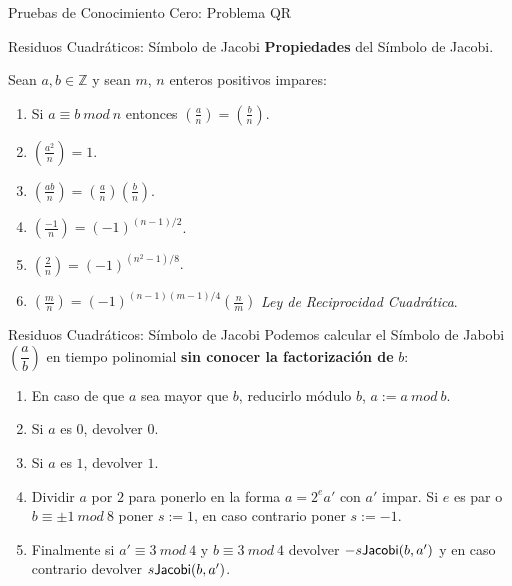 \documentclass{beamer}
\begin{document}
\begin{frame}{Pruebas de Conocimiento Cero: Problema QR}

\end{frame}




\maketitle


\appendix

\begin{frame}{Residuos Cuadráticos: Símbolo de Jacobi}
\textbf{Propiedades} del S\'imbolo de Jacobi.

Sean $a,b \in {\mathbb Z}$ y sean $m$, $n$ enteros positivos impares:
\begin{enumerate}
	\item Si $a\equiv b~mod~n$ entonces $\left( \frac{a}{n} \right) = \left( \frac{b}{n} \right)$.
	\item $\left( \frac{a^2}{n} \right) = 1$.
	\item $\left( \frac{ab}{n} \right) = \left( \frac{a}{n} \right)\left( \frac{b}{n} \right)$.
	\item $\left( \frac{-1}{n} \right) = (-1)^{(n-1)/2}$.
	\item $\left( \frac{2}{n} \right) = (-1)^{(n^2-1)/8}$.
	\item $\left( \frac{m}{n} \right) = (-1)^{(n-1)(m-1)/4} \left( \frac{n}{m} \right)$ \textit{Ley de Reciprocidad Cuadr\'atica}.
\end{enumerate}
\end{frame}

\begin{frame}{Residuos Cuadráticos: Símbolo de Jacobi}
Podemos calcular el Símbolo de Jabobi $\left( \dfrac{a}{b} \right)$ en tiempo polinomial \textbf{sin conocer la factorización de} $b$: 
\begin{enumerate}
\item En caso de que $a$ sea mayor que $b$, reducirlo m\'odulo $b$, $a := a ~ mod ~b$.
\item Si $a$ es $0$, devolver $0$.
\item Si $a$ es $1$, devolver $1$.
\item Dividir $a$ por $2$ para ponerlo en la forma $a = 2^e a'$ con $a'$ impar. Si $e$ es par o $b \equiv \pm 1 ~mod~8$ poner $s := 1$, en caso contrario poner $s := -1$.
\item Finalmente si $a' \equiv 3 ~mod~4$ y $b \equiv 3~mod~4$ devolver $-s {\sf Jacobi}(b,a')$ y en caso contrario devolver $s {\sf Jacobi}(b,a')$.
\end{enumerate}
\end{frame}
\end{document}
